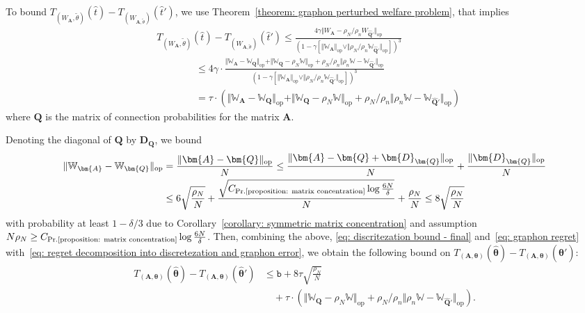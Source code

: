 \documentclass[11pt]{article}
\newcommand{\op}{\mathrm{op}}
\newcommand{\bA}{\bm{A}}
\newcommand{\bQ}{\bm{Q}}
\newcommand{\btheta}{\bm{\theta}}
\newcommand{\bbW}{\mathbb{W}}
\newcommand{\bD}{\bm{D}}
\newcommand{\constantBandeira}{C_{\text{Pr.\ref{proposition: matrix concentration}}}}
\newcommand{\<}{\langle}
\renewcommand{\>}{\rangle}
\newcommand{\ttb}{\mathtt{b}}
\theoremstyle{plain}
\theoremstyle{definition}
\theoremstyle{remark}
\begin{document}
{To bound $T_{(W_{\bA}, \tilde{\theta})}(\hat{t}) - T_{(W_{\bA, \tilde{\theta}})}(\hat{t}')$, we use Theorem~\ref{theorem: graphon perturbed welfare problem}, that implies
\begin{align}
    & T_{(W_{\bA}, \tilde{\theta})}(\hat{t}) - T_{(W_{\bA, \tilde{\theta}})}(\hat{t}')  \le \frac{4 \gamma \Vert W_{\bA} - \rho_N/\rho_n W_{\widehat{\bQ}'} \Vert_{\op}}{(1 - \gamma [\Vert \bbW_{\bA} \Vert_{\op} \vee \Vert \rho_N / \rho_n \bbW_{\widehat{\bQ}'} \Vert_{\op}])^3} \nonumber \\
    & \qquad \qquad \le 4 \gamma  \cdot \frac{\Vert \bbW_{\bA} - \bbW_{\bQ} \Vert_{\op} + \Vert \bbW_{\bQ} - \rho_N \bbW \Vert_{\op} + \rho_N/ \rho_n \Vert \rho_n \bbW - \bbW_{\widehat{\bQ}'} \Vert_{\op}}{(1 - \gamma [\Vert \bbW_{\bA} \Vert_{\op} \vee \Vert \rho_N / \rho_n \bbW_{\widehat{\bQ}'} \Vert_{\op}])^3} \nonumber \\
    & \qquad \qquad = \tau \cdot \left ( \Vert \bbW_{\bA} - \bbW_{\bQ} \Vert_{\op} + \Vert \bbW_{\bQ} - \rho_N \bbW \Vert_{\op} + \rho_N/ \rho_n \Vert \rho_n \bbW - \bbW_{\widehat{\bQ}'} \Vert_{\op}\right ) \label{eq: graphon regret}
\end{align}
where $\bQ$ is the matrix of connection probabilities for the matrix $\bA$.

Denoting the diagonal of $\bQ$ by $\bD_{\bQ}$, we bound
\begin{align*}
    \Vert \bbW_{\bA} - \bbW_{\bQ} \Vert_{\op} & = \frac{\Vert \bA - \bQ \Vert_{\op}}{N} \le \frac{\Vert \bA - \bQ + \bD_{\bQ} \Vert_{\op}}{N} + \frac{\Vert \bD_{\bQ} \Vert_{\op}}{N} \\
    & \le 6 \sqrt{\frac{\rho_N}{N}} + \frac{\sqrt{\constantBandeira \log \frac{6N}{\delta}}}{N}+ \frac{\rho_N}{N} \le 8 \sqrt{\frac{\rho_N}{N}}
\end{align*}
with probability at least $1 - \delta/3$ due to Corollary~\ref{corollary: symmetric matrix concentration} and assumption $N \rho_N \ge \constantBandeira \log \frac{6 N}{\delta}$. Then, combining the above, \eqref{eq: discritezation bound - final} and~\eqref{eq: graphon regret} with~\eqref{eq: regret decomposition into discretezation and graphon error}, we obtain the following bound on $T_{(\bA, \btheta)}(\hat{\btheta}) - T_{(\bA, \btheta)}(\hat{\btheta}')$:
\begin{align}
    T_{(\bA, \btheta)}(\hat{\btheta}) - T_{(\bA, \btheta)}(\hat{\btheta}') & \le \ttb + 8 \tau \sqrt{\frac{\rho_N}{N}} \nonumber \\
    &\quad + \tau \cdot \left (  \Vert \bbW_{\bQ} - \rho_N \bbW \Vert_{\op} + \rho_N/ \rho_n \Vert \rho_n \bbW - \bbW_{\widehat{\bQ}'} \Vert_{\op} \right ). \label{eq: bound up to graphon type}
\end{align}

}
\end{document}
